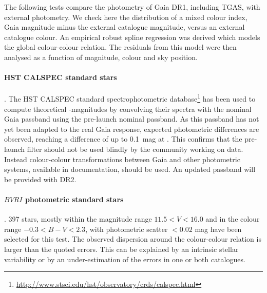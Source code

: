 The following tests compare the photometry of Gaia DR1, including TGAS, with external photometry. We check here the distribution of a mixed colour index, Gaia magnitude minus the external catalogue magnitude, versus an external catalogue colour. An empirical robust spline regression was derived which models the global colour-colour relation. The residuals from this model were then analysed as a function of magnitude, colour and sky position.

\paragraph{HST CALSPEC standard stars} \citep{Bohlin07}. The HST CALSPEC standard spectrophotometric database\footnote{\scriptsize\url{http://www.stsci.edu/hst/observatory/crds/calspec.html}} has been used to compute theoretical \gmag-magnitudes by convolving their spectra with the nominal Gaia passband using the pre-launch nominal passband. As this passband has not yet been adapted to the real Gaia response, expected photometric differences are observed, reaching a difference of up to 0.1~mag  at . This confirms that the pre-launch filter should not be used blindly by the community working on {} data. Instead colour-colour transformations between Gaia and other photometric systems, available in {} documentation, should be used. An updated passband will be provided with DR2. 



\paragraph{$BVRI$ photometric standard stars}  \citep{Landolt92}. 397 stars, mostly within the magnitude range $11.5<V<16.0$ and in the colour range $-0.3<B-V<2.3$, with photometric scatter $<0.02$ mag have been selected for this test. 
The observed dispersion around the colour-colour relation is larger than the quoted errors. This can be explained by an intrinsic stellar variability or by an under-estimation of the errors in one or both catalogues. 

